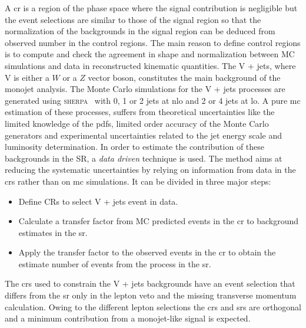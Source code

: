 A \gls{cr} is a region of the phase space where the signal contribution is
negligible but the event selections are similar to those of the signal region so
that the normalization of the backgrounds in the signal region can be deduced
from observed number in the control regions. The main reason to define control
regions is to compute and check the agreement in shape and normalization between
MC simulations and data in reconstructed kinematic quantities. The V + jets,
where V is either a $W$ or a $Z$ vector boson, constitutes the main background
of the monojet analysis. The Monte Carlo simulations for the V + jets processes
are generated using \textsc{sherpa}~\cite{SHERPA} with 0, 1 or 2 jets at
\gls{nlo} and 2 or 4 jets at \gls{lo}. A pure \gls{mc} estimation of these
processes, suffers from theoretical uncertainties like the limited knowledge of
the \glspl{pdf}, limited order accuracy of the Monte Carlo generators and
experimental uncertainties related to the jet energy scale and luminosity
determination. In order to estimate the contribution of these backgrounds in the
SR, a \emph{data driven} technique is used. The method aims at reducing the
systematic uncertainties by relying on information from data in the \glspl{cr}
rather than on \gls{mc} simulations. It can be divided in three major steps:
\begin{itemize}
\item Define CRs to select V + jets event in data.
\item Calculate a transfer factor from MC predicted events in the \gls{cr} to
  background estimates in the \gls{sr}\@.
\item Apply the transfer factor to the observed events in the \gls{cr} to obtain
  the estimate number of events from the process in the \gls{sr}\@.
\end{itemize}
The \glspl{cr} used to constrain the V + jets backgrounds have an event
selection that differs from the \gls{sr} only in the lepton veto and the missing
transverse momentum calculation. Owing to the different lepton selections the
\glspl{cr} and \glspl{sr} are orthogonal and a minimum contribution from a
monojet-like signal is expected.
